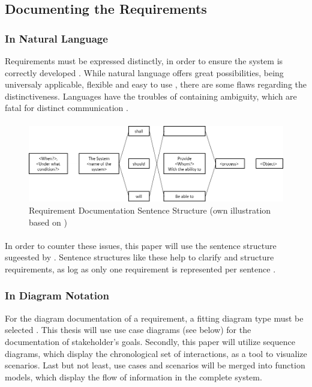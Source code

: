 \subsection{Documenting the Requirements}
\subsubsection{In Natural Language}
Requirements must be expressed distinctly, in order to ensure the system is correctly developed \parencites[107]{Ebert.2014}. While natural language offers great possibilities, being universaly applicable, flexible and easy to use \parencite[cf.][239]{Pohl.2007}, there are some flaws regarding the distinctiveness. Languages have the troubles of containing  ambiguity, which are fatal for distinct communication \parencite[cf.][239-243]{Pohl.2007}.

\paragraph{}
\begin{figure}[H]
    \centering
    \includegraphics[width=\textwidth]{img/SentenceStructure.png}
    \caption{Requirement Documentation Sentence Structure (own illustration based on \cite[246]{Pohl.2007})}
    \label{fig:sentencestructure}
\end{figure}

\paragraph{} In order to counter these issues, this paper will use the sentence structure sugeested by \textcites[107]{Ebert.2014}[246]{Pohl.2007}. Sentence structures like these help to clarify and structure requirements, as log as only one requirement is represented per sentence \parencite[107]{Ebert.2014}. 


\subsubsection{In Diagram Notation}
For the diagram documentation of a requirement, a fitting diagram type must be selected \textcite[299]{Pohl.2007}.  This thesis will use use case diagrams (see below) for the documentation of stakeholder's goals. Secondly, this paper will utilize sequence diagrams, which display the chronological set of interactions, as a tool to visualize scenarios. Last but not least, use cases and scenarios will be merged into function models, which display the flow of information in the complete system. 

